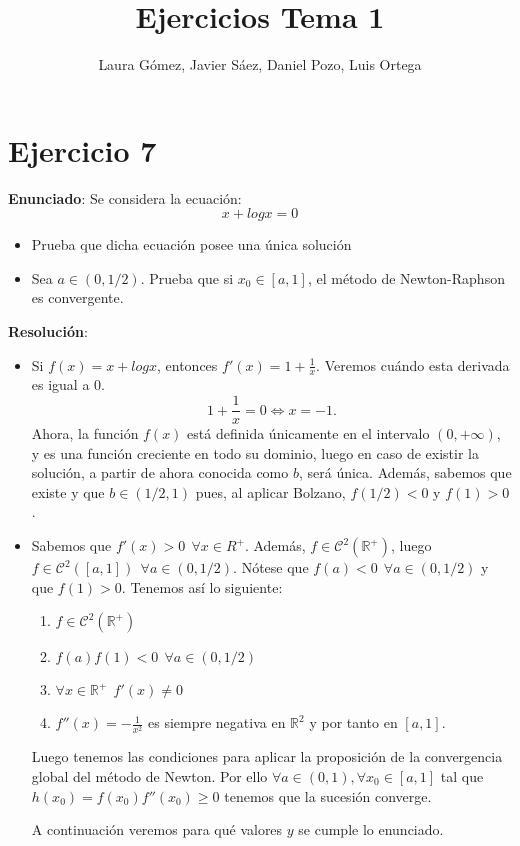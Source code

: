 \documentclass[11pt]{article}
\title{\textbf{Ejercicios Tema 1}}
\author{Laura Gómez, Javier Sáez, Daniel Pozo, Luis Ortega}
\begin{document}
\maketitle
\section{Ejercicio 7}
\textbf{Enunciado}: Se considera la ecuación:
\[
x + logx = 0
\]
\begin{itemize}
	\item Prueba que dicha ecuación posee una única solución
	\item Sea $a \in (0, 1/2)$. Prueba que si $x_0 \in [a,1]$, el método de Newton-Raphson es convergente.
\end{itemize}
\textbf{Resolución}:\\
\begin{itemize}
	\item Si $f(x) = x + logx$, entonces $f'(x) = 1 + \frac{1}{x}$. Veremos cuándo esta derivada es igual a 0.
	\[
	1+\frac{1}{x} = 0 \iff x = -1.
	\]
	Ahora, la función $f(x)$ está definida únicamente en el intervalo $(0,+\infty)$, y es una función creciente en todo su dominio, luego en caso de existir la solución, a partir de ahora conocida como $b$, será única. Además, sabemos que existe y que $b\in(1/2,1)$ pues, al aplicar Bolzano, $f(1/2) < 0$ y $f(1) > 0$.
	
	\item Sabemos que $f'(x)>0 \ \ \forall x \in R^+$. Además, $f\in \mathcal{C}^2(\mathbb{R}^+)$, luego $f\in \mathcal{C}^2([a,1]) \ \ \forall a \in (0,1/2)$. Nótese que $f(a) < 0 \ \ \forall a \in (0,1/2)$ y que $f(1) > 0$. Tenemos así lo siguiente:
	\begin{enumerate}
	\item $f \in \mathcal C ^2 (\mathbb R ^+)$
	\item $f(a)f(1) < 0 \ \  \forall a \in (0,1/2)$
	\item $\forall x \in \mathbb R ^+ \ \ f'(x) \ne 0$
	\item $f''(x)= -\frac{1}{x^2}$ es siempre negativa en $\mathbb R ^2$ y por tanto en $[a,1]$.
\end{enumerate}
Luego tenemos las condiciones para aplicar la proposición de la convergencia global del método de Newton. Por ello $\forall a \in (0,1), \forall x_0 \in [a,1]$ tal que $h(x_0)=f(x_0)f''(x_0)\geq0$ tenemos que la sucesión converge.

A continuación veremos para qué valores $y$ se cumple lo enunciado.


\end{itemize}
\end{document}
